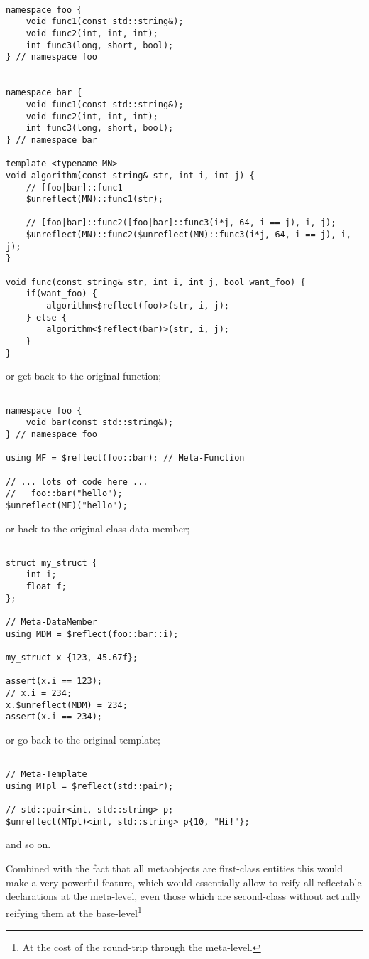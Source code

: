 \begin{verbatim}

namespace foo {
	void func1(const std::string&);
	void func2(int, int, int);
	int func3(long, short, bool);
} // namespace foo


namespace bar {
	void func1(const std::string&);
	void func2(int, int, int);
	int func3(long, short, bool);
} // namespace bar

template <typename MN>
void algorithm(const string& str, int i, int j) {
	// [foo|bar]::func1
	$unreflect(MN)::func1(str);

	// [foo|bar]::func2([foo|bar]::func3(i*j, 64, i == j), i, j);
	$unreflect(MN)::func2($unreflect(MN)::func3(i*j, 64, i == j), i, j);
}

void func(const string& str, int i, int j, bool want_foo) {
	if(want_foo) {
		algorithm<$reflect(foo)>(str, i, j);
	} else {
		algorithm<$reflect(bar)>(str, i, j);
	}
}

\end{verbatim}

or get back to the original function;

\begin{verbatim}

namespace foo {
	void bar(const std::string&);
} // namespace foo

using MF = $reflect(foo::bar); // Meta-Function

// ... lots of code here ...
//   foo::bar("hello");
$unreflect(MF)("hello");

\end{verbatim}

or back to the original class data member;

\begin{verbatim}

struct my_struct {
	int i;
	float f;
};

// Meta-DataMember
using MDM = $reflect(foo::bar::i);

my_struct x {123, 45.67f};

assert(x.i == 123);
// x.i = 234;
x.$unreflect(MDM) = 234;
assert(x.i == 234);

\end{verbatim}

or go back to the original template;

\begin{verbatim}

// Meta-Template
using MTpl = $reflect(std::pair);

// std::pair<int, std::string> p;
$unreflect(MTpl)<int, std::string> p{10, "Hi!"};

\end{verbatim}

and so on.

Combined with the fact that all metaobjects are first-class
entities this would make a very powerful feature, which would essentially
allow to reify all reflectable declarations at the meta-level, even those which are
second-class without actually reifying them at the base-level\footnote
{At the cost of the round-trip through the meta-level.}

